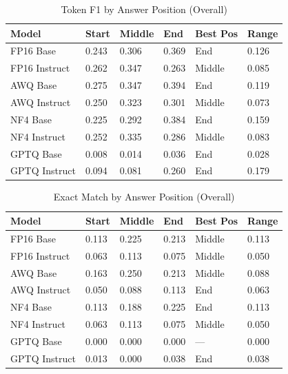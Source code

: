 \documentclass[11pt,a4paper]{article}
\begin{document}
\begin{table}[H]
\centering
\caption{Token F1 by Answer Position (Overall)}
\begin{tabularx}{\textwidth}{@{}X C{1.8cm} C{1.8cm} C{1.8cm} C{2cm} C{1.8cm}@{}}
\toprule
\textbf{Model} & \textbf{Start} & \textbf{Middle} & \textbf{End} & \textbf{Best Pos} & \textbf{Range} \\
\midrule
FP16 Base & 0.243 & 0.306 & 0.369 & End & 0.126 \\
FP16 Instruct & 0.262 & 0.347 & 0.263 & Middle & 0.085 \\
AWQ Base & 0.275 & 0.347 & 0.394 & End & 0.119 \\
AWQ Instruct & 0.250 & 0.323 & 0.301 & Middle & 0.073 \\
NF4 Base & 0.225 & 0.292 & 0.384 & End & 0.159 \\
NF4 Instruct & 0.252 & 0.335 & 0.286 & Middle & 0.083 \\
GPTQ Base & 0.008 & 0.014 & 0.036 & End & 0.028 \\
GPTQ Instruct & 0.094 & 0.081 & 0.260 & End & 0.179 \\
\bottomrule
\end{tabularx}
\end{table}

\begin{table}[H]
\centering
\caption{Exact Match by Answer Position (Overall)}
\begin{tabularx}{\textwidth}{@{}X C{1.8cm} C{1.8cm} C{1.8cm} C{2cm} C{1.8cm}@{}}
\toprule
\textbf{Model} & \textbf{Start} & \textbf{Middle} & \textbf{End} & \textbf{Best Pos} & \textbf{Range} \\
\midrule
FP16 Base & 0.113 & 0.225 & 0.213 & Middle & 0.113 \\
FP16 Instruct & 0.063 & 0.113 & 0.075 & Middle & 0.050 \\
AWQ Base & 0.163 & 0.250 & 0.213 & Middle & 0.088 \\
AWQ Instruct & 0.050 & 0.088 & 0.113 & End & 0.063 \\
NF4 Base & 0.113 & 0.188 & 0.225 & End & 0.113 \\
NF4 Instruct & 0.063 & 0.113 & 0.075 & Middle & 0.050 \\
GPTQ Base & 0.000 & 0.000 & 0.000 & --- & 0.000 \\
GPTQ Instruct & 0.013 & 0.000 & 0.038 & End & 0.038 \\
\bottomrule
\end{tabularx}
\end{table}
\end{document}
